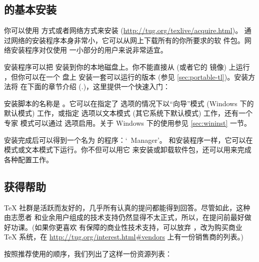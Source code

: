\documentclass{article}
\begin{document}
\subsection{\protect\TL{} 的基本安装}
\label{sec:basic}

你可以使用 \DVD{} 方式或者网络方式来安装 \TL{}
(\url{http://tug.org/texlive/acquire.html})。
通过网络的安装程序本身非常小，它可以从网上下载所有的你所要求的软
件包。网络安装程序对仅使用 \TL{} 一小部分的用户来说非常适宜。

\DVD{} 安装程序可以把 \TL{} 安装到你的本地磁盘上。你不能直接从 \TK{}
\DVD{} (或者它的  镜像) 上运行 \TL{}，但你可以在一个 \USB{} 盘上
安装一套可以运行的版本 (参见 \ref{sec:portable-tl})。安装方法将
在下面的章节介绍 (\p.\pageref{sec:install})，这里提供一个快速入门：

\begin{itemize*}

\item 安装脚本的名称是 。它可以在指定了
 选项的情况下以“向导”模式 (Windows 下的默认模式)
工作，或指定  选项以文本模式 (其它系统下默认模式)
工作，还有一个专家 \GUI{} 模式可以通过 
选项启用。关于 Windows 下的使用参见 \ref{sec:wininst} 一节。

\item 安装完成后可以得到一个名为  的程序：`\TL\ Manager'。
和安装程序一样，它可以在 \GUI{} 模式或文本模式下运行。你不但可以用它
来安装或卸载软件包，还可以用来完成各种配置工作。

\end{itemize*}


\subsection{获得帮助}
\label{sec:help}

\TeX{} 社群是活跃而友好的，几乎所有认真的提问都能得到回答。尽管如此，这种由志愿者
和业余用户组成的技术支持仍然显得不太正式，所以，在提问前最好做好功课。(如果你更喜欢
有保障的商业性技术支持，可以放弃 \TL{}，改为购买商业 \TeX{} 系统，在
\url{http://tug.org/interest.html#vendors} 上有一份销售商的列表。)

按照推荐使用的顺序，我们列出了这样一份资源列表：
\end{document}
